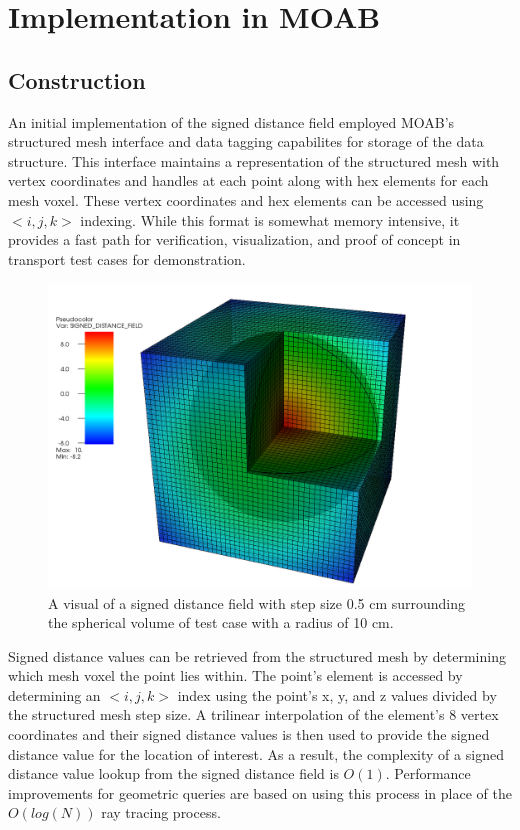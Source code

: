 \section{Implementation in MOAB}

\subsection{Construction}

An initial implementation of the signed distance field employed MOAB's
structured mesh interface and data tagging capabilites for storage of the data
structure. This interface maintains a representation of the structured mesh with
vertex coordinates and handles at each point along with hex elements for each
mesh voxel. These vertex coordinates and hex elements can be accessed using
$<i,j,k>$ indexing. While this format is somewhat memory intensive, it provides
a fast path for verification, visualization, and proof of concept in transport
test cases for demonstration.

\begin{figure}
  \begin{center}
  \includegraphics[scale=0.22]{../images/sdf_sphere.png}
  \caption{A visual of a signed distance field with step size 0.5 cm surrounding
    the spherical volume of test case with a radius of 10 cm.}
  \end{center}
  \label{fig:sdf_sphere}
\end{figure}

Signed distance values can be retrieved from the structured mesh by determining
which mesh voxel the point lies within. The point's element is accessed by
determining an $<i,j,k>$ index using the point's x, y, and z values divided by
the structured mesh step size. A trilinear interpolation of the element's 8 vertex
coordinates and their signed distance values is then used to provide the signed
distance value for the location of interest. As a result, the complexity of a
signed distance value lookup from the signed distance field is
$O(1)$. Performance improvements for geometric queries are based on using this
process in place of the $O(log(N))$ ray tracing process.

